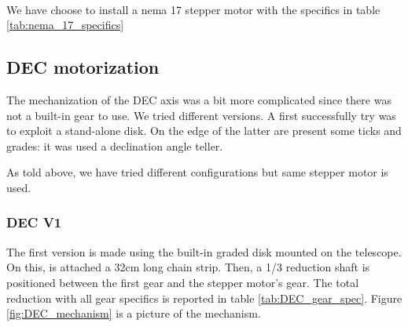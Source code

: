 \documentclass{article}
\begin{document}
\begin{multicols}{2}
\begin{minipage}{.4\textwidth}
            \label{fig:RA_mechanization}         
        \end{minipage}
        \\
        We have choose to install a nema 17 stepper motor with the specifics in table \ref{tab:nema_17_specifics}

        \subsection{DEC motorization}
        The mechanization of the DEC axis was a bit more complicated since there was not a built-in gear to use.
        We tried different versions.
        A first successfully try was to exploit a stand-alone disk.
        On the edge of the latter are present some ticks and grades: it was used a declination angle teller.

        As told above, we have tried different configurations but same stepper motor is used.

        \subsubsection{DEC V1}
        The first version is made using the built-in graded disk mounted on the telescope.
        On this, is attached a 32cm long chain strip.
        Then, a 1/3 reduction shaft is positioned between the first gear and the stepper motor's gear.
        The total reduction with all gear specifics is reported in table \ref{tab:DEC_gear_spec}.
        Figure \ref{fig:DEC_mechanism} is a picture of the mechanism.


\end{multicols}
\end{document}
